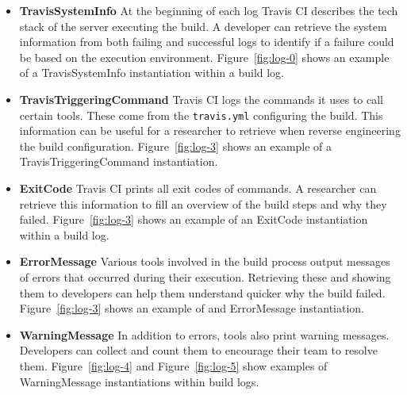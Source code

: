 \documentclass[\myrootdir/main.tex]{subfiles}
\begin{document}
\begin{itemize}
	\item \textbf{TravisSystemInfo} At the beginning of each log Travis CI describes the tech stack of the server executing the build.
				A developer can retrieve the system information from both failing and successful logs to identify if a failure could be based on the execution environment.
	      Figure~\ref{fig:log-0} shows an example of a TravisSystemInfo instantiation within a build log.

	\item \textbf{TravisTriggeringCommand} Travis CI logs the commands it uses to call certain tools.
	      These come from the \texttt{travis.yml} configuring the build.
				This information can be useful for a researcher to retrieve when reverse engineering the build configuration.
	      Figure~\ref{fig:log-3} shows an example of a TravisTriggeringCommand instantiation.

	\item \textbf{ExitCode} Travis CI prints all exit codes of commands.
				A researcher can retrieve this information to fill an overview of the build steps and why they failed.
	      Figure~\ref{fig:log-3} shows an example of an ExitCode instantiation within a build log.

	\item \textbf{ErrorMessage} Various tools involved in the build process output messages of errors that occurred during their execution.
	      Retrieving these and showing them to developers can help them understand quicker why the build failed.
	      Figure~\ref{fig:log-3} shows an example of and ErrorMessage instantiation.

	\item \textbf{WarningMessage} In addition to errors, tools also print warning messages.
				Developers can collect and count them to encourage their team to resolve them.
	      Figure~\ref{fig:log-4} and Figure~\ref{fig:log-5} show examples of WarningMessage instantiations within build logs.

\end{itemize}
\end{document}
